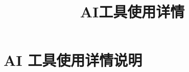 \documentclass[12pt,a4paper]{article}
\theoremstyle{plain}  %
\theoremstyle{definition}  %
\theoremstyle{remark}  %
\begin{document}
\title{%
    AI工具使用详情
}
\date{}  %
\maketitle


\newpage

\section{AI 工具使用详情说明}

\newpage

\end{document}
